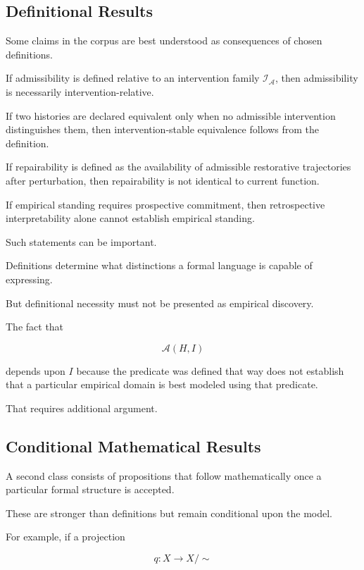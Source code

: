 \documentclass[11pt]{article}
\theoremstyle{remark}
\newcommand{\Adm}{\mathcal{A}}
\begin{document}
\subsection{Definitional Results}

Some claims in the corpus are best understood as consequences of chosen
definitions.

If admissibility is defined relative to an intervention family
$\mathcal{I}_{\Adm}$, then admissibility is necessarily intervention-relative.

If two histories are declared equivalent only when no admissible intervention
distinguishes them, then intervention-stable equivalence follows from the
definition.

If repairability is defined as the availability of admissible restorative
trajectories after perturbation, then repairability is not identical to current
function.

If empirical standing requires prospective commitment, then retrospective
interpretability alone cannot establish empirical standing.

Such statements can be important.

Definitions determine what distinctions a formal language is capable of
expressing.

But definitional necessity must not be presented as empirical discovery.

The fact that

\begin{equation}
\Adm(H,I)
\end{equation}

depends upon $I$ because the predicate was defined that way does not establish
that a particular empirical domain is best modeled using that predicate.

That requires additional argument.

\subsection{Conditional Mathematical Results}

A second class consists of propositions that follow mathematically once a
particular formal structure is accepted.

These are stronger than definitions but remain conditional upon the model.

For example, if a projection

\begin{equation}
q:X\rightarrow X/{\sim}
\end{equation}
\end{document}
